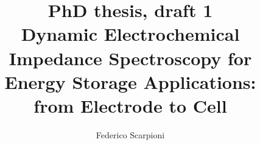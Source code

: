 \title{PhD thesis, draft 1 \\ 
Dynamic Electrochemical Impedance Spectroscopy for Energy Storage Applications: \\ from Electrode to Cell}
\author{Federico Scarpioni}